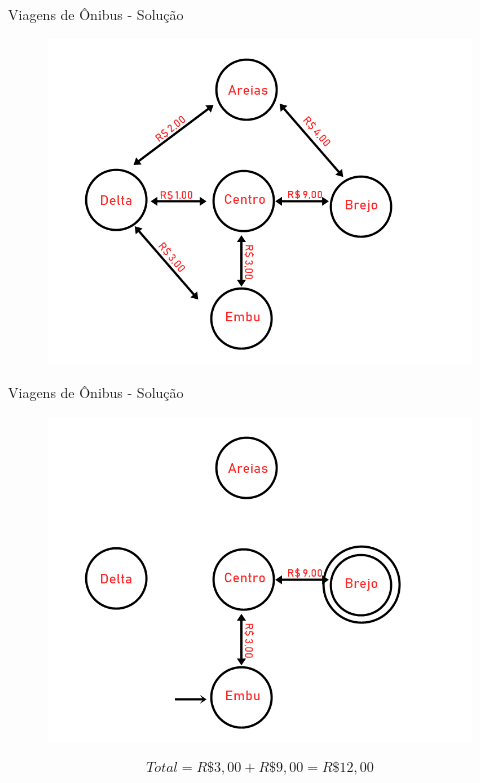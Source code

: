 \documentclass{beamer}
\begin{document}
\begin{frame}{Viagens de Ônibus - Solução}
\begin{figure}[ht]
\centering
\includegraphics[width=.8\textwidth]{onibus.png}
\label{fig:exampleFig2}
\end{figure}
\end{frame}

\begin{frame}{Viagens de Ônibus - Solução}
\begin{figure}[ht]
\centering
\includegraphics[width=.7\textwidth]{caminho1.png}
\label{fig:exampleFig2}
\end{figure}
\begin{equation*}
    Total = R\$3,00 + R\$9,00 = R\$12,00  
\end{equation*}

\end{frame}
\end{document}
